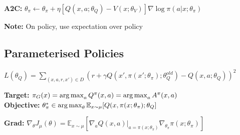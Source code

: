 \textbf{A2C:} $\theta_\pi \leftarrow \theta_\pi + \eta [Q(x,a;\theta_Q) - V(x;\theta_V)] \nabla \log \pi(a | x;\theta_\pi)$\\
 \begin{comment}
 	This is not unbiased anymore, since the Q value is only an approximation. If we would use the true Q value, we would have a convergence guarantee.\\
 	We can guarantee improvement by introducing compatibility conditions.\\
\end{comment}
 
\textbf{Note:} On policy, use expectation over policy\\
\begin{comment}
	\textbf{Bootleneck:} The problem with on-policy methods is that they have sample inefficiencies. We always need to sample from the current policy.\\
\end{comment}

\subsection{Parameterised Policies}
$L(\theta_Q) = \sum_{(x,a,r,x') \in D} ( r + \gamma Q(x',\pi(x'; \theta_\pi); \theta^{old}_Q) - Q(x,a;\theta_Q))^2$\\
\begin{comment}
	The initial motivation was $L(\theta)$, we can replace this exact (untractable) maximum with a parameterised policy.\\
\end{comment}
\textbf{Target:} $\pi_G(x) = \operatorname*{arg\,max}_a Q^\pi(x,a) = \operatorname*{arg\,max}_a A^\pi(x, a)$\\

\textbf{Objective:} $\theta_\pi^* \in \operatorname*{arg\,max}_\theta \mathbb{E}_{x \sim \mu}[Q(x, \pi(x;\theta_\pi); \theta_Q]$\\
\begin{comment}
	$\mu(x)$ must be complex enough to be able to explore all states, making it possible to converge to the maximum state.\\
\end{comment}

\textbf{Grad:} $\nabla_\theta J_{\mu}(\theta) = \mathbb{E}_{x \sim \mu}[\nabla_a Q(x, a)|_{a=\pi(x; \theta_\pi)} \nabla_{\theta_\pi} \pi(x;\theta_\pi)]$\\
\begin{comment}
	The policies gradient methods we saw before relied on randomized policies for exploration. This method uses a deterministic policy.\\
	We can inject gaussian noise to encourage exploration.\\
\end{comment}

